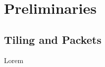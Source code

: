 \section{Preliminaries}\label{sec:preliminaries}
\subsection{Tiling and Packets}\label{subsec:tiling-and-packets}
Lorem
